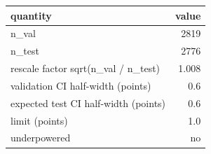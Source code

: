 \begin{tabular}{lr}
\toprule
quantity & value \\
\midrule
n\_val & 2819 \\
n\_test & 2776 \\
rescale factor sqrt(n\_val / n\_test) & 1.008 \\
validation CI half-width (points) & 0.6 \\
expected test CI half-width (points) & 0.6 \\
limit (points) & 1.0 \\
underpowered & no \\
\bottomrule
\end{tabular}
